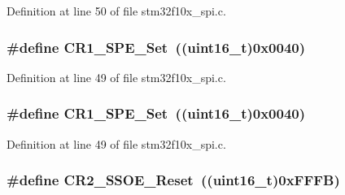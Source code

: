 Definition at line 50 of file stm32f10x\+\_\+spi.\+c.

\subsubsection[{\texorpdfstring{C\+R1\+\_\+\+S\+P\+E\+\_\+\+Set}{CR1_SPE_Set}}]{\setlength{\rightskip}{0pt plus 5cm}\#define C\+R1\+\_\+\+S\+P\+E\+\_\+\+Set~(({\bf uint16\+\_\+t})0x0040)}\hypertarget{group___s_p_i___private___defines_ga74286f403309d32b56fed10aba2ebf91}{}\label{group___s_p_i___private___defines_ga74286f403309d32b56fed10aba2ebf91}


Definition at line 49 of file stm32f10x\+\_\+spi.\+c.

\subsubsection[{\texorpdfstring{C\+R1\+\_\+\+S\+P\+E\+\_\+\+Set}{CR1_SPE_Set}}]{\setlength{\rightskip}{0pt plus 5cm}\#define C\+R1\+\_\+\+S\+P\+E\+\_\+\+Set~(({\bf uint16\+\_\+t})0x0040)}\hypertarget{group___s_p_i___private___defines_ga74286f403309d32b56fed10aba2ebf91}{}\label{group___s_p_i___private___defines_ga74286f403309d32b56fed10aba2ebf91}


Definition at line 49 of file stm32f10x\+\_\+spi.\+c.

\subsubsection[{\texorpdfstring{C\+R2\+\_\+\+S\+S\+O\+E\+\_\+\+Reset}{CR2_SSOE_Reset}}]{\setlength{\rightskip}{0pt plus 5cm}\#define C\+R2\+\_\+\+S\+S\+O\+E\+\_\+\+Reset~(({\bf uint16\+\_\+t})0x\+F\+F\+F\+B)}\hypertarget{group___s_p_i___private___defines_ga475caaaef8732d35e4c6fd3f21dc4e3c}{}\label{group___s_p_i___private___defines_ga475caaaef8732d35e4c6fd3f21dc4e3c}


